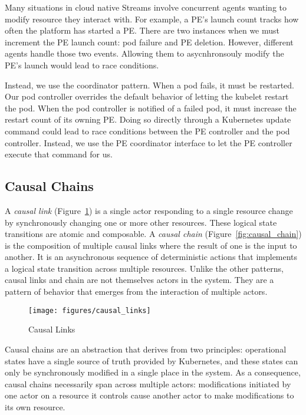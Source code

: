 Many situations in cloud native Streams involve concurrent agents wanting to
modify resource they interact with. For example, a PE's launch count tracks how 
often the platform has started a PE. There are two instances when we must increment 
the PE launch count: pod failure and PE deletion. However, different agents handle 
those two events. Allowing them to asycnhronsouly modify the PE's launch would 
lead to race conditions.

Instead, we use the coordinator pattern. When a pod fails, it must be restarted.
Our pod controller overrides the default behavior of letting the kubelet restart
the pod. When the pod controller is notified of a failed pod, it must increase the restart
count of its owning PE. Doing so directly through a Kubernetes update command
could lead to race conditions between the PE controller and the pod controller.
Instead, we use the PE coordinator interface to let the PE controller execute
that command for us.

\subsection{Causal Chains}
\label{sec:causal}

A \emph{causal link} (Figure~\ref{fig:causal_links}) is a single actor
responding to a single resource change by synchronously changing one or more
other resources. These logical state transitions are atomic and composable. A
\emph{causal chain} (Figure~\ref{fig:causal_chain}) is the composition of
multiple causal links where the result of one is the input to another. It is an
asynchronous sequence of deterministic actions that implements a logical state transition
across multiple resources. Unlike the other patterns, causal links and chain are
not themselves actors in the system.  They are a pattern of behavior that
emerges from the interaction of multiple actors.

\begin{figure}[h]
  \centering
  \texttt{[image: figures/causal\_links]}
  \caption{Causal Links}
  \label{fig:causal_links}
\end{figure}

Causal chains are an abstraction that derives from two principles: operational
states have a single source of truth provided by Kubernetes, and these states
can only be synchronously modified in a single place in the system. As a consequence, 
causal chains necessarily span across multiple actors: modifications initiated by one 
actor on a resource it controls cause another actor to make modifications to its 
own resource.

